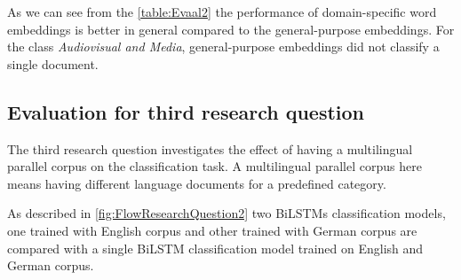 \begin{table}[!ht]
\label{table:Evaal2}
\end{table}

As we can see from the \ref{table:Evaal2} the performance of domain-specific word embeddings is better in general compared to the general-purpose embeddings. For the class \textit{Audiovisual and Media}, general-purpose embeddings did not classify a single document. 
\clearpage

\subsection{Evaluation for third research question}

The third research question investigates the effect of having a multilingual parallel corpus on the classification task. A multilingual parallel corpus here means having different language documents for a predefined category. 

As described in \ref{fig:FlowResearchQuestion2} two \glspl{BiLSTM} classification models, one trained with English corpus and other trained with German corpus are compared with a single \gls{BiLSTM} classification model trained on English and German corpus.

